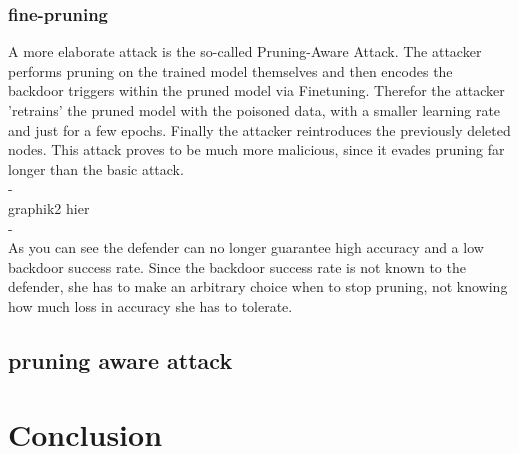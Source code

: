 \documentclass[a4paper,12pt]{report}
\begin{document}
\subsection{fine-pruning}
A more elaborate attack is the so-called Pruning-Aware Attack. The attacker performs pruning on the trained model themselves and then encodes the backdoor triggers within the pruned model via Finetuning. Therefor the attacker 'retrains' the pruned model with the poisoned data, with a smaller learning rate and just for a few epochs. Finally the attacker reintroduces the previously deleted nodes. This attack proves to be much more malicious, since it evades pruning far longer than the basic attack.
\\
-\\
graphik2 hier\\
-\\
As you can see the defender can no longer guarantee high accuracy and a low backdoor success rate. Since the backdoor success rate is not known to the defender, she has to make an arbitrary choice when to stop pruning, not knowing how much loss in accuracy she has to tolerate.
\section{pruning aware attack}




\chapter{Conclusion}
	
	
	
\listoffigures

	
	
	
	
	
	
	
	
	
	
	
	
	
	
	
	
	
	
	
	
\end{document}
